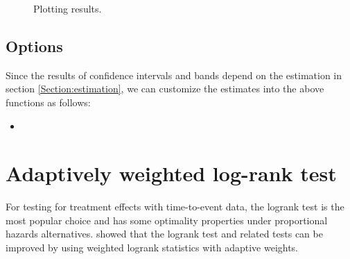 \documentclass[12pt]{article}
\newcommand{\insertcode}[2]{\begin{itemize}\item[]\end{itemize}} %
\begin{document}
\begin{figure}[H]
\caption{Plotting results.}
\label{fig:plot2}
\end{figure}

\subsection{Options}\label{intervalOption}
Since the results of confidence intervals and bands depend on the estimation in section \ref{Section:estimation}, we can customize the estimates into the above functions as follows:
\insertcode{"Scripts/code14 - 2.pl"}{Performing confidence intervals and bands estimation with customized estimates.}

\section{Adaptively weighted log-rank test}\label{Section.logrank}
For testing for treatment effects with time-to-event data, the logrank test is the most popular choice and has
some optimality properties under proportional hazards alternatives.
\cite{yang2009improved} showed that
the logrank test and related tests can be improved by using
weighted logrank statistics with adaptive weights.
\end{document}

